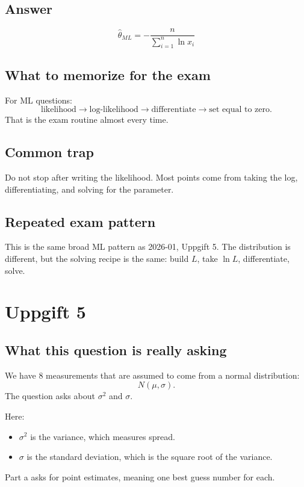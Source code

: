 \documentclass[11pt,a4paper]{article}
\begin{document}
\subsection*{Answer}
\[
\boxed{\hat{\theta}_{ML}=-\frac{n}{\sum_{i=1}^n \ln x_i}}
\]

\subsection*{What to memorize for the exam}
For ML questions:
\[
\text{likelihood} \rightarrow \text{log-likelihood} \rightarrow \text{differentiate} \rightarrow \text{set equal to zero}.
\]
That is the exam routine almost every time.

\subsection*{Common trap}
Do not stop after writing the likelihood. Most points come from taking the log, differentiating, and solving for the parameter.

\subsection*{Repeated exam pattern}
This is the same broad ML pattern as 2026-01, Uppgift 5. The distribution is different, but the solving recipe is the same: build \(L\), take \(\ln L\), differentiate, solve.

\section*{Uppgift 5}

\subsection*{What this question is really asking}
We have 8 measurements that are assumed to come from a normal distribution:
\[
N(\mu,\sigma).
\]
The question asks about \(\sigma^2\) and \(\sigma\).

Here:
\begin{itemize}[leftmargin=*]
    \item \(\sigma^2\) is the variance, which measures spread.
    \item \(\sigma\) is the standard deviation, which is the square root of the variance.
\end{itemize}

Part a asks for point estimates, meaning one best guess number for each.
\end{document}

